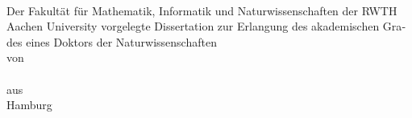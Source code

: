 
\begin{titlepage}
	\begin{addmargin}[-0cm]{-0.5cm}
		\begin{center}

			\begin{otherlanguage}{ngerman}
			\vspace*{3cm}
			\begingroup
				\LARGE
				\color{RWTHblau}
				{\scshape \myTitle}\\
			\endgroup

			\vspace{3cm}
			\Large
			{Der Fakultät für Mathematik, Informatik und Naturwissenschaften der RWTH Aachen University vorgelegte Dissertation zur Erlangung des akademischen Grades eines Doktors der Naturwissenschaften}\\
			\vspace{0.3cm}
			{von}\\
			\vspace{3cm}
			{\myName}\\
			\vspace{0.3cm}
			\Large
			{aus} \\
			\vspace{0.3cm}
			\Large
			{Hamburg} \\


			\end{otherlanguage}

  	\end{center}
	\end{addmargin}
\end{titlepage}

